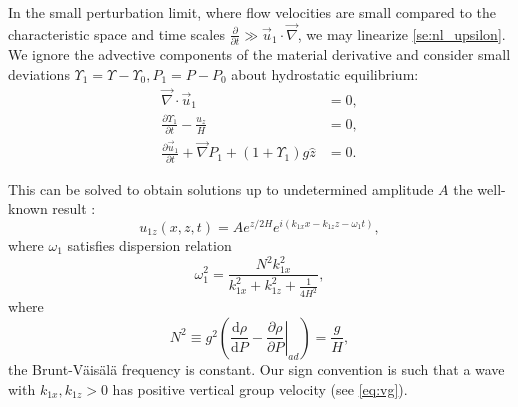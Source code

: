 \documentclass[
        fleqn,
        usenatbib,
    ]{mnras}
\newcommand*{\rd}[2]{\frac{\mathrm{d}#1}{\mathrm{d}#2}}
\newcommand*{\pd}[2]{\frac{\partial#1}{\partial#2}}
\newcommand*{\at}[1]{\left.#1\right|}
\newcommand*{\p}[1]{\left(#1\right)}
\begin{document}
In the small perturbation limit, where flow velocities are small compared to the
characteristic space and time scales $\pd{}{t} \gg \vec{u}_1 \cdot \vec{\nabla}$,
we may linearize \autoref{se:nl_upsilon}. We ignore the advective components of the
material derivative and consider small deviations $\Upsilon_1 = \Upsilon -
\Upsilon_0, P_1 = P - P_0$ about hydrostatic equilibrium:
\begin{subequations}\label{se:lin_homo}
    \begin{align}
        \vec{\nabla} \cdot \vec{u}_1 &= 0,\\
        \pd{\Upsilon_1}{t} - \frac{u_{z}}{H} &= 0,\\
        \pd{\vec{u}_1}{t} + \vec{\nabla}P_1
            + \p{1 + \Upsilon_1} g\hat{z}
            &= 0.
    \end{align}
\end{subequations}

This can be solved to obtain solutions up to undetermined amplitude $A$ the
well-known result \citep{drazin,sutherland0}:
\begin{equation}
    u_{1z}\p{x, z, t} = Ae^{z/2H}e^{i\p{k_{1x}x - k_{1z}z - \omega_1 t}},
        \label{eq:k0z_sign}
\end{equation}
where $\omega_1$ satisfies dispersion relation
\begin{equation}
    \omega_1^2 = \frac{N^2k_{1x}^2}{k_{1x}^2 + k_{1z}^2 + \frac{1}{4H^2}},
        \label{eq:disp_rel}
\end{equation}
where
\begin{equation}
    N^2 \equiv g^2\p{\rd{\rho}{P} - \at{\pd{\rho}{P}}_{ad}} = \frac{g}{H},
\end{equation}
the Brunt-V\"ais\"al\"a frequency is constant. Our sign convention is such that
a wave with $k_{1x}, k_{1z} > 0$ has positive vertical group velocity (see
\autoref{eq:vg}).
\end{document}
